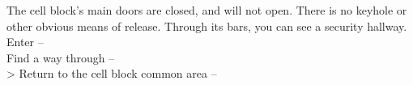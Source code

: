 The cell block’s main doors are closed, and will not open. There is no keyhole or other obvious means of release. Through its bars, you can see a security hallway.\\

 Enter -- \\
 Find a way through -- \\
> Return to the cell block common area -- 